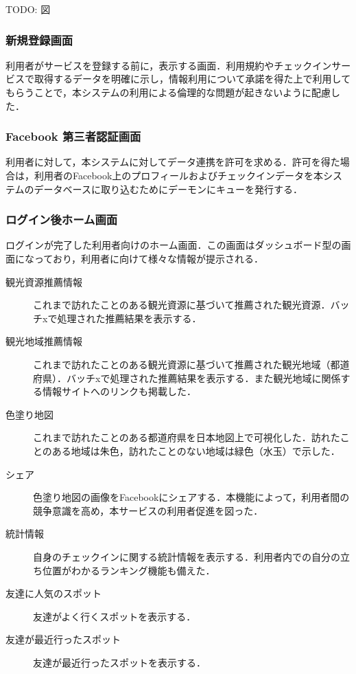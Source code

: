 \documentclass{jsarticle}
\begin{document}
TODO: 図

\subsubsection{新規登録画面}

利用者がサービスを登録する前に，表示する画面．利用規約やチェックインサービスで取得するデータを明確に示し，情報利用について承諾を得た上で利用してもらうことで，本システムの利用による倫理的な問題が起きないように配慮した．


\subsubsection{Facebook 第三者認証画面}

利用者に対して，本システムに対してデータ連携を許可を求める．許可を得た場合は，利用者のFacebook上のプロフィールおよびチェックインデータを本システムのデータベースに取り込むためにデーモンにキューを発行する．

\subsubsection{ログイン後ホーム画面}

ログインが完了した利用者向けのホーム画面．この画面はダッシュボード型の画面になっており，利用者に向けて様々な情報が提示される．

\begin{description}
\item[観光資源推薦情報] これまで訪れたことのある観光資源に基づいて推薦された観光資源．バッチxで処理された推薦結果を表示する．
\item[観光地域推薦情報] これまで訪れたことのある観光資源に基づいて推薦された観光地域（都道府県）．バッチxで処理された推薦結果を表示する．また観光地域に関係する情報サイトへのリンクも掲載した．
\item[色塗り地図] これまで訪れたことのある都道府県を日本地図上で可視化した．訪れたことのある地域は朱色，訪れたことのない地域は緑色（水玉）で示した．
\item[シェア] 色塗り地図の画像をFacebookにシェアする．本機能によって，利用者間の競争意識を高め，本サービスの利用者促進を図った．
\item[統計情報] 自身のチェックインに関する統計情報を表示する．利用者内での自分の立ち位置がわかるランキング機能も備えた．
\item[友達に人気のスポット] 友達がよく行くスポットを表示する．
\item[友達が最近行ったスポット] 友達が最近行ったスポットを表示する．
\end{description}
\end{document}
